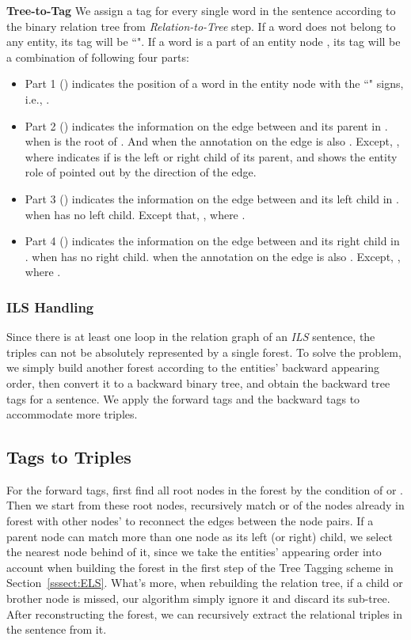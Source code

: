 \documentclass[conference]{IEEEtran}
\begin{document}
\textbf{Tree-to-Tag} We assign a tag for every single word in the sentence according to the binary relation tree  from \emph{Relation-to-Tree} step. If a word does not belong to any entity, its tag will be ``". If a word is a part of an entity node , its tag will be a combination of following four parts:
\begin{itemize}
	\item Part 1 () indicates the position of a word in the entity node  with the 
    ``" signs, i.e., .

	\item Part 2 () indicates the information on the edge between  and its parent in 
    .  when  is the root of . And  when the annotation on 
    the edge is also . Except, , where 
     indicates if  is the left or right child of its 
    parent, and  shows the entity role of  pointed out by 
    the direction of the edge.

	\item Part 3 () indicates the information on the edge between  and its left child 
    in .  when  has no left child. Except that, , where 
    .

	\item Part 4 () indicates the information on the edge between  and its right child 
    in .  when  has no right child.  when the annotation on 
    the edge is also . Except, , where .
\end{itemize}

\subsubsection{ILS Handling}
Since there is at least one loop in the relation graph of an \emph{ILS} sentence, the triples can not be absolutely represented by a single forest. To solve the problem, we simply build another forest according to the entities' backward appearing order, then convert it to a backward binary tree, and obtain the backward tree tags for a sentence. We apply the forward tags and the backward tags to accommodate more triples.

\subsection{Tags to Triples}
For the forward tags, first find all root nodes in the forest by the condition of  or . Then we start from these root nodes, recursively match  or  of the nodes already in forest with other nodes'  to reconnect the edges between the node pairs. If a parent node can match more than one node as its left (or right) child, we select the nearest node behind of it, since we take the entities’ appearing order into account when building the forest in the first step of the Tree Tagging scheme in Section~\ref{sssect:ELS}. What’s more, when rebuilding the relation tree, if a child or brother node is missed, our algorithm simply ignore it and discard its sub-tree. After reconstructing the forest, we can recursively extract the relational triples in the sentence from it.
\end{document}
